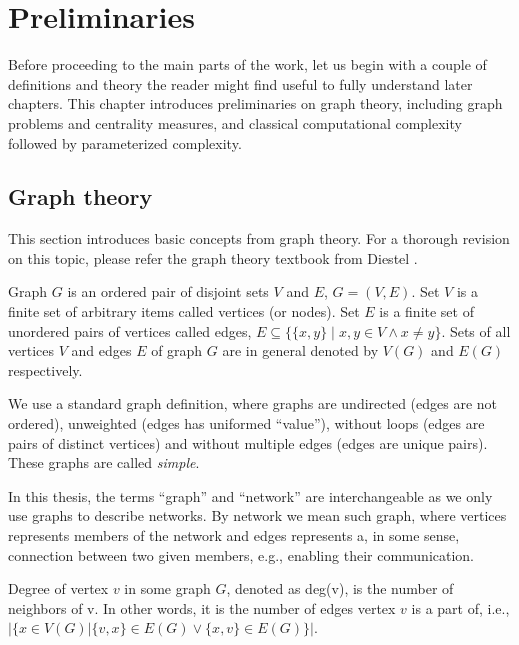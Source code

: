 \chapter{Preliminaries}

Before proceeding to the main parts of the work,
let us begin with a couple of definitions and theory the reader might find useful to fully understand later chapters.
This chapter introduces preliminaries on graph theory, including graph problems and centrality measures, and 
classical computational complexity followed by parameterized complexity.


\section{Graph theory}

This section introduces basic concepts from graph theory.
For a thorough revision on this topic, please refer the graph theory textbook from Diestel \cite{Diestel2018}.

\begin{definition}[Graph]
    Graph $G$ is an ordered pair of disjoint sets $V$ and $E$, $G=(V,E)$.
    Set $V$ is a finite set of arbitrary items called vertices (or nodes).
    Set $E$ is a finite set of unordered pairs of vertices called edges, $E \subseteq \{\{x,y\} \mid x,y \in V \wedge x \neq y\}$.
    Sets of all vertices $V$ and edges $E$ of graph $G$ are in general denoted by $V(G)$ and $E(G)$ respectively.
\end{definition}

We use a standard graph definition, where graphs are undirected (edges are not ordered),
unweighted (edges has uniformed ``value''), without loops (edges are pairs of distinct vertices) and
without multiple edges (edges are unique pairs).
These graphs are called \emph{simple}.

In this thesis, the terms ``graph'' and ``network'' are interchangeable as we only use graphs to describe networks.
By network we mean such graph, where vertices represents members of the network 
and edges represents a, in some sense, connection between two given members, e.g., enabling their communication.

\begin{definition}
    Degree of vertex $v$ in some graph $G$, denoted as deg(v), is the number of neighbors of v.
    In other words, it is the number of edges vertex $v$ is a part of, i.e.,
    $\Big|\{x \in V(G) \vert \{v,x\} \in E(G) \vee \{x,v\} \in E(G)\}\Big|$.
\end{definition}

